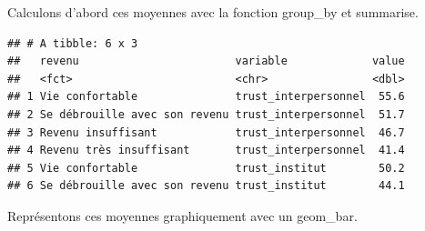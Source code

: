 \documentclass[
]{book}
\newenvironment{Shaded}{\begin{snugshade}}{\end{snugshade}}
\newcommand{\CommentTok}[1]{\textcolor[rgb]{0.56,0.35,0.01}{\textit{#1}}}
\newcommand{\DataTypeTok}[1]{\textcolor[rgb]{0.13,0.29,0.53}{#1}}
\newcommand{\KeywordTok}[1]{\textcolor[rgb]{0.13,0.29,0.53}{\textbf{#1}}}
\newcommand{\NormalTok}[1]{#1}
\newcommand{\OperatorTok}[1]{\textcolor[rgb]{0.81,0.36,0.00}{\textbf{#1}}}
\newcommand{\OtherTok}[1]{\textcolor[rgb]{0.56,0.35,0.01}{#1}}
\newcommand{\StringTok}[1]{\textcolor[rgb]{0.31,0.60,0.02}{#1}}
\begin{document}
Calculons d'abord ces moyennes avec la fonction group\_by et summarise.

\begin{Shaded}
\end{Shaded}

\begin{verbatim}
## # A tibble: 6 x 3
##   revenu                        variable             value
##   <fct>                         <chr>                <dbl>
## 1 Vie confortable               trust_interpersonnel  55.6
## 2 Se débrouille avec son revenu trust_interpersonnel  51.7
## 3 Revenu insuffisant            trust_interpersonnel  46.7
## 4 Revenu très insuffisant       trust_interpersonnel  41.4
## 5 Vie confortable               trust_institut        50.2
## 6 Se débrouille avec son revenu trust_institut        44.1
\end{verbatim}

Représentons ces moyennes graphiquement avec un geom\_bar.
\end{document}
